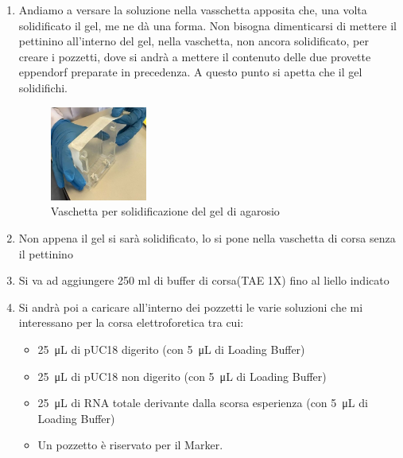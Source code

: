 \begin{enumerate}
	\item Andiamo a versare la soluzione nella vasschetta apposita che, una volta solidificato il gel, me ne dà una forma. Non bisogna dimenticarsi di mettere il pettinino all'interno del gel, nella vaschetta, non ancora solidificato, per creare i pozzetti, dove si andrà a mettere il contenuto delle due provette eppendorf preparate in precedenza. A questo punto si apetta che il gel solidifichi.
	
	\begin{figure}[H]
	
		\centering
		\includegraphics[width=0.3\textwidth]{./immagini/vaschetta.jpg}
		\caption{Vaschetta per solidificazione del gel di agarosio}
		\label{vaschetta}
		
	\end{figure}
	
	
	\item Non appena il gel si sarà solidificato, lo si pone nella vaschetta di corsa senza il pettinino
	
	\item Si va ad aggiungere 250 ml di buffer di corsa(TAE 1X) fino al liello indicato
	
	\item Si andrà poi a caricare all'interno dei pozzetti le varie soluzioni che mi interessano per la corsa elettroforetica tra cui: 
	
	\begin{itemize}
	
		\item \SI{25}{\micro\liter} di pUC18 digerito (con \SI{5}{\micro\liter} di Loading Buffer)
		\item \SI{25}{\micro\liter} di pUC18 non digerito (con \SI{5}{\micro\liter} di Loading Buffer)
		\item \SI{25}{\micro\liter} di RNA totale derivante dalla scorsa esperienza (con \SI{5}{\micro\liter} di Loading Buffer)
		\item Un pozzetto è riservato per il Marker.
	
	\end{itemize}
	

\end{enumerate}
